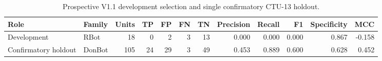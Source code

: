 \begin{table}[htbp]
\centering
\caption{Prospective V1.1 development selection and single confirmatory CTU-13 holdout.}
\label{tab:ctu13-confirmatory}
\small
\begin{adjustbox}{max width=\textwidth}
\begin{tabular}{llrrrrrrrrrr}
\toprule
Role & Family & Units & TP & FP & FN & TN & Precision & Recall & F1 & Specificity & MCC \\
\midrule
Development & RBot & 18 & 0 & 2 & 3 & 13 & 0.000 & 0.000 & 0.000 & 0.867 & -0.158 \\
Confirmatory holdout & DonBot & 105 & 24 & 29 & 3 & 49 & 0.453 & 0.889 & 0.600 & 0.628 & 0.452 \\
\bottomrule
\end{tabular}
\end{adjustbox}
\par{}
\par{}
\end{table}
